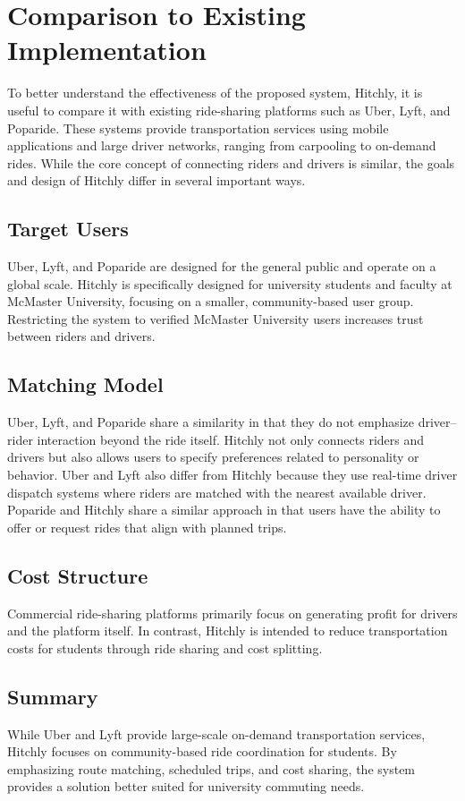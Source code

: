 \section{Comparison to Existing Implementation}

To better understand the effectiveness of the proposed system,
Hitchly, it is useful to compare it with existing ride-sharing
platforms such as Uber, Lyft, and Poparide. These systems provide
transportation services using mobile applications and large driver
networks, ranging from carpooling to on-demand rides. While the core
concept of connecting riders and drivers is similar, the goals and
design of Hitchly differ in several important ways.

\subsection{Target Users}

Uber, Lyft, and Poparide are designed for the general public and
operate on a global scale. Hitchly is specifically designed for
university students and faculty at McMaster University, focusing on
a smaller, community-based user group. Restricting the system to
verified McMaster University users increases trust between riders
and drivers.

\subsection{Matching Model}

Uber, Lyft, and Poparide share a similarity in that they do not
emphasize driver–rider interaction beyond the ride itself. Hitchly
not only connects riders and drivers but also allows users to specify
preferences related to personality or behavior. Uber and Lyft also
differ from Hitchly because they use real-time driver dispatch
systems where riders are matched with the nearest available driver.
Poparide and Hitchly share a similar approach in that users have the
ability to offer or request rides that align with planned trips.

\subsection{Cost Structure}

Commercial ride-sharing platforms primarily focus on generating
profit for drivers and the platform itself. In contrast, Hitchly is
intended to reduce transportation costs for students through ride
sharing and cost splitting.

\subsection{Summary}

While Uber and Lyft provide large-scale on-demand transportation
services, Hitchly focuses on community-based ride coordination for
students. By emphasizing route matching, scheduled trips, and cost
sharing, the system provides a solution better suited for university
commuting needs.
